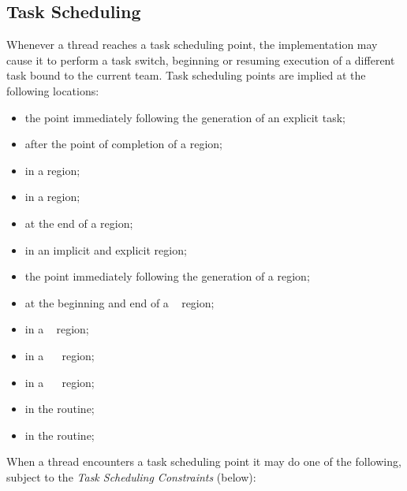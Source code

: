 \subsection{Task Scheduling}
\label{subsec:Task Scheduling}
Whenever a thread reaches a task scheduling point, the implementation may cause it to
perform a task switch, beginning or resuming execution of a different task bound to the
current team. Task scheduling points are implied at the following locations:

\begin{itemize}
\item the point immediately following the generation of an explicit task;

\item after the point of completion of a  region;

\item in a  region;

\item in a  region;

\item at the end of a  region;

\item in an implicit and explicit  region;

\item the point immediately following the generation of a  region;

\item at the beginning and end of a ~ region;

\item in a ~ region;

\item in a ~~ region;

\item in a ~~ region;

\item in the  routine;

\item in the  routine;

\end{itemize}

When a thread encounters a task scheduling point it may do one of the following,
subject to the \emph{Task Scheduling Constraints} (below):

